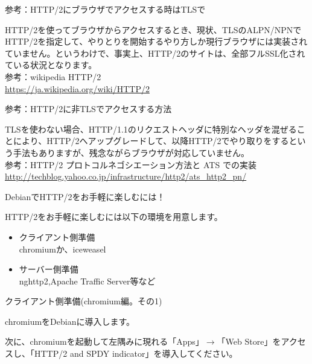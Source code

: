 \begin{frame}{参考：HTTP/2にブラウザでアクセスする時はTLSで}

  HTTP/2を使ってブラウザからアクセスするとき、現状、TLSのALPN/NPNでHTTP/2を指定して、やりとりを開始するやり方しか現行ブラウザには実装されていません。というわけで、事実上、HTTP/2のサイトは、全部フルSSL化されている状況となります。\\
  参考：wikipedia HTTP/2 \\
    \url{https://ja.wikipedia.org/wiki/HTTP/2}

\end{frame}

\begin{frame}{参考：HTTP/2に非TLSでアクセスする方法}
    
  TLSを使わない場合、HTTP/1.1のリクエストヘッダに特別なヘッダを混ぜることにより、HTTP/2へアップグレードして、以降HTTP/2でやり取りをするという手法もありますが、残念ながらブラウザが対応していません。\\

  参考：HTTP/2 プロトコルネゴシエーション方法と ATS での実装\\
  \url{http://techblog.yahoo.co.jp/infrastructure/http2/ats_http2_pn/}
  
\end{frame}


\begin{frame}{DebianでHTTP/2をお手軽に楽しむには！}

 HTTP/2をお手軽に楽しむには以下の環境を用意します。

 \begin{itemize}
  \item クライアント側準備\\
    chromiumか、iceweasel
  \item サーバー側準備\\
     nghttp2,Apache Traffic Server等など
 \end{itemize}  

\end{frame}

\begin{frame}[containsverbatim]{クライアント側準備(chromium編。その1)}

chromiumをDebianに導入します。
  
次に、chromiumを起動して左隅みに現れる「Apps」$\rightarrow$「Web Store」をアクセスし、「HTTP/2 and SPDY indicator」を導入してください。

\end{frame}

